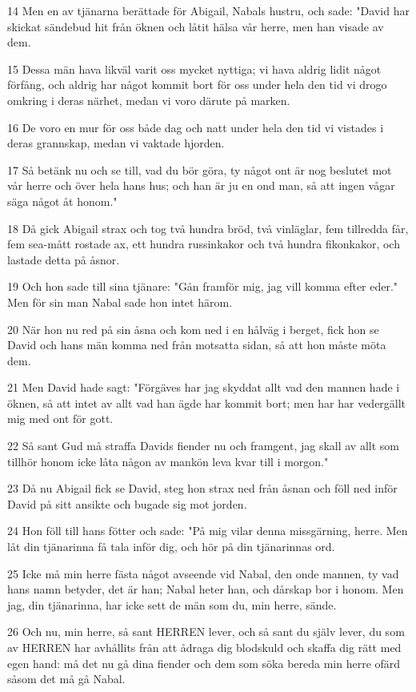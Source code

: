\par 14 Men en av tjänarna berättade för Abigail, Nabals hustru, och sade: "David har skickat sändebud hit från öknen och låtit hälsa vår herre, men han visade av dem.
\par 15 Dessa män hava likväl varit oss mycket nyttiga; vi hava aldrig lidit något förfång, och aldrig har något kommit bort för oss under hela den tid vi drogo omkring i deras närhet, medan vi voro därute på marken.
\par 16 De voro en mur för oss både dag och natt under hela den tid vi vistades i deras grannskap, medan vi vaktade hjorden.
\par 17 Så betänk nu och se till, vad du bör göra, ty något ont är nog beslutet mot vår herre och över hela hans hus; och han är ju en ond man, så att ingen vågar säga något åt honom."
\par 18 Då gick Abigail strax och tog två hundra bröd, två vinläglar, fem tillredda får, fem sea-mått rostade ax, ett hundra russinkakor och två hundra fikonkakor, och lastade detta på åsnor.
\par 19 Och hon sade till sina tjänare: "Gån framför mig, jag vill komma efter eder." Men för sin man Nabal sade hon intet härom.
\par 20 När hon nu red på sin åsna och kom ned i en hålväg i berget, fick hon se David och hans män komma ned från motsatta sidan, så att hon måste möta dem.
\par 21 Men David hade sagt: "Förgäves har jag skyddat allt vad den mannen hade i öknen, så att intet av allt vad han ägde har kommit bort; men har har vedergällt mig med ont för gott.
\par 22 Så sant Gud må straffa Davids fiender nu och framgent, jag skall av allt som tillhör honom icke låta någon av mankön leva kvar till i morgon."
\par 23 Då nu Abigail fick se David, steg hon strax ned från åsnan och föll ned inför David på sitt ansikte och bugade sig mot jorden.
\par 24 Hon föll till hans fötter och sade: "På mig vilar denna missgärning, herre. Men låt din tjänarinna få tala inför dig, och hör på din tjänarinnas ord.
\par 25 Icke må min herre fästa något avseende vid Nabal, den onde mannen, ty vad hans namn betyder, det är han; Nabal heter han, och dårskap bor i honom. Men jag, din tjänarinna, har icke sett de män som du, min herre, sände.
\par 26 Och nu, min herre, så sant HERREN lever, och så sant du själv lever, du som av HERREN har avhållits från att ådraga dig blodskuld och skaffa dig rätt med egen hand: må det nu gå dina fiender och dem som söka bereda min herre ofärd såsom det må gå Nabal.

